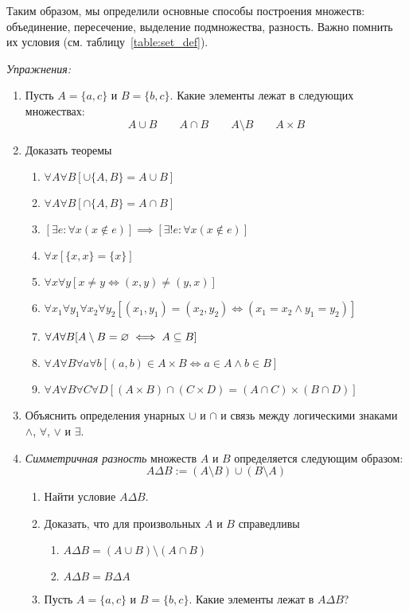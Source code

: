 Таким образом, мы определили основные способы построения множеств:
объединение, пересечение, выделение подмножества, разность.
Важно помнить их условия (см. таблицу~\ref{table:set_def}).

\vspace{1em}
{\it Упражнения:}
\begin{enumerate}
  \item{}Пусть $A=\{a,c\}$ и $B=\{b,c\}$. Какие элементы лежат в следующих
  множествах:
  \[
    A\cup B\qquad A\cap B\qquad A\setminus B\qquad
    A\times B
  \]
  \item{}Доказать теоремы
  \begin{enumerate}
    \item{}$\forall A\forall B[\cup \{A,B\}=A\cup B]$
    \item{}$\forall A\forall B[\cap \{A,B\}=A\cap B]$
    \item{}$[\exists e:\forall x(x\notin e)]\implies
      [\exists!e:\forall x(x\notin e)]$ \label{ex:eset_only}
    \item{}$\forall x[\{x,x\}=\{x\}]$
    \item{}$\forall x\forall y[x\neq y\iff (x,y)\neq (y,x)]$
    \item{}$\forall x_1\forall y_1\forall x_2\forall y_2
      [(x_1,y_1)=(x_2,y_2)\iff (x_1=x_2\land y_1=y_2)]$
    \item{}$\forall A\forall B[A\setminus B=\varnothing\iff A\subseteq B]$
    \item{}$\forall A\forall B\forall a\forall b
        [(a,b)\in A\times B\iff a\in A\land b\in B]$
    \item{}$\forall A\forall B\forall C\forall D
        [(A\times B)\cap (C\times D)=(A\cap C)\times (B\cap D)]$
  \end{enumerate}
  \item{}Объяснить определения унарных $\cup$ и $\cap$
  и связь между логическими знаками $\land$, $\forall$, $\lor$ и $\exists$.
  \item{}{\it Симметричная разность}
  множеств $A$ и $B$ определяется следующим образом:
  \[
    A\Delta B:=(A\setminus B)\cup (B\setminus A)
  \]
  \begin{enumerate}
    \item{}Найти условие $A\Delta B$.
    \item{}Доказать, что для произвольных $A$ и $B$ справедливы
    \begin{enumerate}
      \item{}$A\Delta B=(A\cup B)\setminus (A\cap B)$
      \item{}$A\Delta B=B\Delta A$
    \end{enumerate}
    \item{}Пусть $A=\{a,c\}$ и $B=\{b,c\}$. Какие элементы лежат в $A\Delta B$?
  \end{enumerate}
\end{enumerate}
